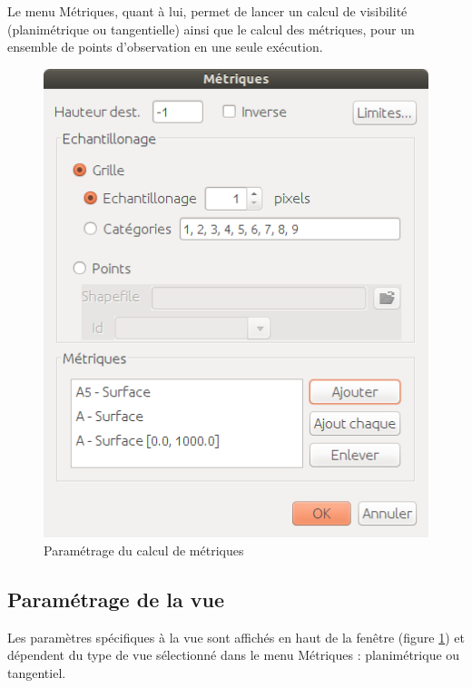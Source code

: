 \documentclass{report}
\begin{document}
Le menu Métriques, quant à lui, permet de lancer un calcul de visibilité (planimétrique ou tangentielle) ainsi que le calcul des métriques, pour un ensemble de points d'observation en une seule exécution. 

\begin{figure}[H]
	\includegraphics[scale=0.5]{img/metrics-fr.png} 
	\caption{Paramétrage du calcul de métriques}
	\label{metrics_dlg}
\end{figure}

\subsection{Paramétrage de la vue}
Les paramètres spécifiques à la vue sont affichés en haut de la fenêtre (figure \ref{metrics_dlg}) et dépendent du type de vue sélectionné dans le menu Métriques : planimétrique ou tangentiel.
\end{document}
